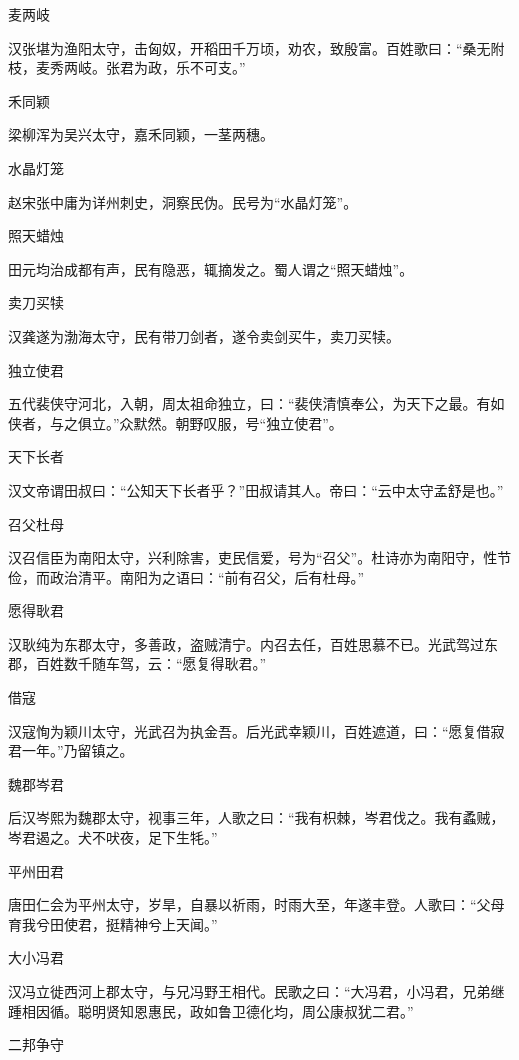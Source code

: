 \documentclass[a4paper,12pt,UTF8,twoside]{ctexbook}
\begin{document}
    麦两岐
    
    汉张堪为渔阳太守，击匈奴，开稻田千万顷，劝农，致殷富。百姓歌曰：“桑无附枝，麦秀两岐。张君为政，乐不可支。”
    
    禾同颖
    
    梁柳浑为吴兴太守，嘉禾同颖，一茎两穗。
    
    水晶灯笼
    
    赵宋张中庸为详州刺史，洞察民伪。民号为“水晶灯笼”。
    
    照天蜡烛
    
    田元均治成都有声，民有隐恶，辄摘发之。蜀人谓之“照天蜡烛”。
    
    卖刀买犊
    
    汉龚遂为渤海太守，民有带刀剑者，遂令卖剑买牛，卖刀买犊。
    
    独立使君
    
    五代裴侠守河北，入朝，周太祖命独立，曰：“裴侠清慎奉公，为天下之最。有如侠者，与之俱立。”众默然。朝野叹服，号“独立使君”。
    
    天下长者
    
    汉文帝谓田叔曰：“公知天下长者乎？”田叔请其人。帝曰：“云中太守孟舒是也。”
    
    召父杜母
    
    汉召信臣为南阳太守，兴利除害，吏民信爱，号为“召父”。杜诗亦为南阳守，性节俭，而政治清平。南阳为之语曰：“前有召父，后有杜母。”
    
    愿得耿君
    
    汉耿纯为东郡太守，多善政，盗贼清宁。内召去任，百姓思慕不已。光武驾过东郡，百姓数千随车驾，云：“愿复得耿君。”
    
    借寇
    
    汉寇恂为颖川太守，光武召为执金吾。后光武幸颖川，百姓遮道，曰：“愿复借寂君一年。”乃留镇之。
    
    魏郡岑君
    
    后汉岑熙为魏郡太守，视事三年，人歌之曰：“我有枳棘，岑君伐之。我有蟊贼，岑君遏之。犬不吠夜，足下生牦。”
    
    平州田君
    
    唐田仁会为平州太守，岁旱，自暴以祈雨，时雨大至，年遂丰登。人歌曰：“父母育我兮田使君，挺精神兮上天闻。”
    
    大小冯君
    
    汉冯立徙西河上郡太守，与兄冯野王相代。民歌之曰：“大冯君，小冯君，兄弟继踵相因循。聪明贤知恩惠民，政如鲁卫德化均，周公康叔犹二君。”
    
    二邦争守
    
\end{document}
